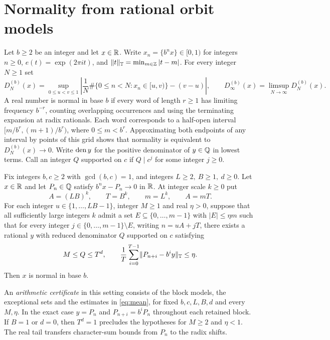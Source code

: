 \documentclass[11pt]{article}
\newcommand{\circabs}[1]{\lVert #1\rVert_{\T}}
\begin{document}
\section{Normality from rational orbit models}
Let \(b\ge2\) be an integer and let \(x\in\mathbb R\). Write \(x_n=\{b^n x\}\in[0,1)\) for integers \(n\ge0\), \(e(t)=\exp(2\pi i t)\), and
\(\circabs{t}=\min_{m\in\Z}|t-m|\). For every integer \(N\ge1\) set
\[
 D_N^{(b)}(x)=\sup_{0\le u<v\le1}
 \left|\frac1N\#\{0\le n<N:x_n\in[u,v)\}-(v-u)\right|,
 \qquad D_\infty^{(b)}(x)=\limsup_{N\to\infty}D_N^{(b)}(x).
\]
A real number is normal in base \(b\) if every word of length \(r\ge1\) has limiting frequency \(b^{-r}\), counting overlapping occurrences and using the terminating expansion at radix rationals. Each word corresponds to a half-open interval \([m/b^r,(m+1)/b^r)\), where \(0\le m<b^r\). Approximating both endpoints of any interval by points of this grid shows that normality is equivalent to \(D_N^{(b)}(x)\to0\). Write \(\operatorname{den} y\) for the positive denominator of \(y\in\mathbb Q\) in lowest terms. Call an integer \(Q\) supported on \(c\) if \(Q\mid c^j\) for some integer \(j\ge0\).

\begin{theorem}\label{thm:mean}
Fix integers \(b,c\ge2\) with \(\gcd(b,c)=1\), and integers \(L\ge2,\ B\ge1,\ d\ge0\). Let \(x\in\mathbb R\) and let \(P_n\in\mathbb Q\) satisfy \(b^nx-P_n\to0\) in \(\mathbb R\). At integer scale \(k\ge0\) put
\[
 A=(LB)^k,\qquad T=B^k,\qquad m=L^k,\qquad A=mT.
\]
For each integer \(u\in\{1,\ldots,LB-1\}\), integer \(M\ge1\) and real \(\eta>0\), suppose that all sufficiently large integers \(k\) admit a set \(E\subseteq\{0,\ldots,m-1\}\) with \(|E|\le\eta m\) such that for every integer \(j\in\{0,\ldots,m-1\}\setminus E\), writing \(n=uA+jT\), there exists a rational \(y\) with reduced denominator \(Q\) supported on \(c\) satisfying
\begin{equation}\label{eq:mean}
 M\le Q\le T^d,\qquad
 \frac1T\sum_{i=0}^{T-1}\circabs{P_{n+i}-b^i y}\le\eta .
\end{equation}
Then \(x\) is normal in base \(b\).
\end{theorem}

An \emph{arithmetic certificate} in this setting consists of the block models, the exceptional sets and the estimates in \eqref{eq:mean}, for fixed \(b,c,L,B,d\) and every \(M,\eta\). In the exact case \(y=P_n\) and \(P_{n+i}=b^iP_n\) throughout each retained block. If \(B=1\) or \(d=0\), then \(T^d=1\) precludes the hypotheses for \(M\ge2\) and \(\eta<1\). The real tail transfers character-sum bounds from \(P_n\) to the radix shifts.
\end{document}
